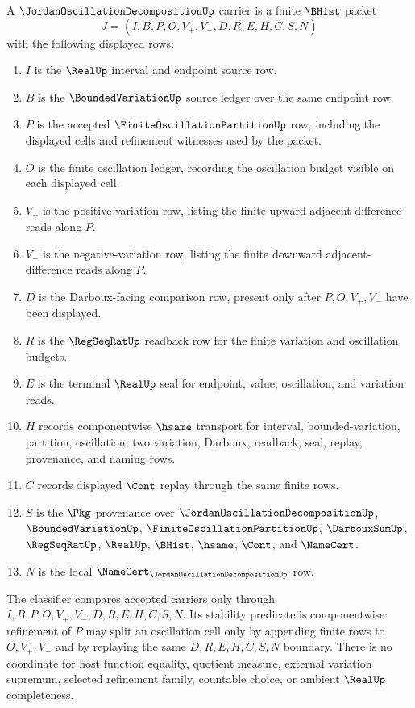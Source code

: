 \begin{definition}
\label{def:jordan-oscillation-decomposition-carrier}
A $\JordanOscillationDecompositionUp$ carrier is a finite $\BHist$ packet
$$
J=(I,B,P,O,V_{+},V_{-},D,R,E,H,C,S,N)
$$
with the following displayed rows:
\begin{enumerate}
\item $I$ is the $\RealUp$ interval and endpoint source row.
\item $B$ is the $\BoundedVariationUp$ source ledger over the same endpoint row.
\item $P$ is the accepted $\FiniteOscillationPartitionUp$ row, including the displayed cells and refinement witnesses used by the packet.
\item $O$ is the finite oscillation ledger, recording the oscillation budget visible on each displayed cell.
\item $V_{+}$ is the positive-variation row, listing the finite upward adjacent-difference reads along $P$.
\item $V_{-}$ is the negative-variation row, listing the finite downward adjacent-difference reads along $P$.
\item $D$ is the Darboux-facing comparison row, present only after $P,O,V_{+},V_{-}$ have been displayed.
\item $R$ is the $\RegSeqRatUp$ readback row for the finite variation and oscillation budgets.
\item $E$ is the terminal $\RealUp$ seal for endpoint, value, oscillation, and variation reads.
\item $H$ records componentwise $\hsame$ transport for interval, bounded-variation, partition, oscillation, two variation, Darboux, readback, seal, replay, provenance, and naming rows.
\item $C$ records displayed $\Cont$ replay through the same finite rows.
\item $S$ is the $\Pkg$ provenance over $\JordanOscillationDecompositionUp$, $\BoundedVariationUp$, $\FiniteOscillationPartitionUp$, $\DarbouxSumUp$, $\RegSeqRatUp$, $\RealUp$, $\BHist$, $\hsame$, $\Cont$, and $\NameCert$.
\item $N$ is the local $\NameCert_{\JordanOscillationDecompositionUp}$ row.
\end{enumerate}
The classifier compares accepted carriers only through $I,B,P,O,V_{+},V_{-},D,R,E,H,C,S,N$. Its stability predicate is componentwise: refinement of $P$ may split an oscillation cell only by appending finite rows to $O,V_{+},V_{-}$ and by replaying the same $D,R,E,H,C,S,N$ boundary. There is no coordinate for host function equality, quotient measure, external variation supremum, selected refinement family, countable choice, or ambient $\RealUp$ completeness.
\end{definition}

